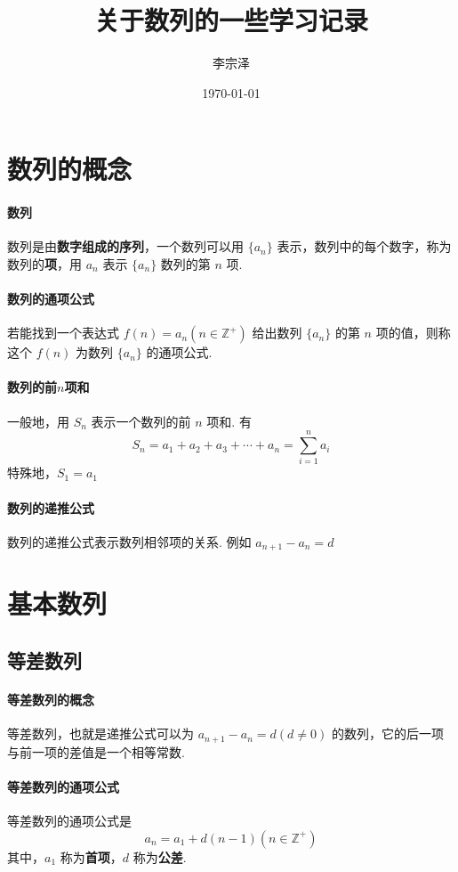\documentclass[UTF8]{ctexart}
\title{关于数列的一些学习记录}
\author{李宗泽}
\date{\today}
\def\inlinedisplay#1{$\displaystyle #1$}
\begin{document}
	\maketitle
	\section{数列的概念}
	\paragraph{数列}
	数列是由\textbf{数字组成的序列}，一个数列可以用 $\{a_n\}$ 表示，数列中的每个数字，称为数列的\textbf{项}，用 $a_n$ 表示 $\{a_n\}$ 数列的第 $n$ 项.
	\paragraph{数列的通项公式}
	若能找到一个表达式 \inlinedisplay{f(n) = a_n (n \in \mathbb{Z} ^ +)} 给出数列 $\{a_n\}$ 的第 $n$ 项的值，则称这个 $f(n)$ 为数列 $\{a_n\}$ 的通项公式.
	\paragraph{数列的前$n$项和}
	一般地，用 $S_n$ 表示一个数列的前 $n$ 项和. 有 
	\[S_n=a_1+a_2+a_3+\cdots+a_n=\sum_{i=1}^n a_i\]
	特殊地，$S_1=a_1$
	\paragraph{数列的递推公式}
	数列的递推公式表示数列相邻项的关系. 例如 \inlinedisplay{a_{n+1}-a_n = d}
	
	\section{基本数列}
	\subsection{等差数列}
	\paragraph{等差数列的概念}
	等差数列，也就是递推公式可以为 \inlinedisplay{a_{n+1}-a_n=d (d \ne 0)} 的数列，它的后一项与前一项的差值是一个相等常数.
	\paragraph{等差数列的通项公式}
	等差数列的通项公式是
	\[a_n = a_1 + d(n-1) (n \in \mathbb{Z} ^ +)\]
	其中，$a_1$ 称为\textbf{首项}，$d$ 称为\textbf{公差}.
\end{document}
